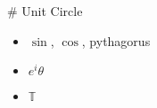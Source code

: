 # Unit Circle

\begin{itemize}
    \item $\sin$, $\cos$, pythagorus
    \item $e^i\theta$
    \item $\mathbb{T}$
\end{itemize}
